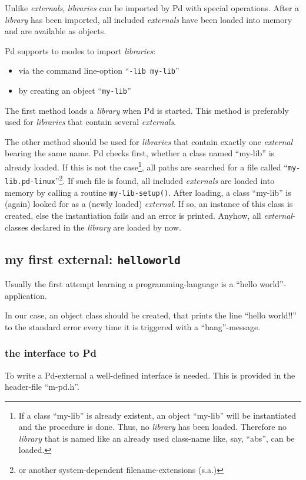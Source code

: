 \documentclass{ppgmus}
\begin{document}
Unlike {\em externals}, {\em libraries} can be imported by Pd with special operations.
After a {\em library} has been imported,
all included {\em externals} have been loaded into memory and are available as objects.

Pd supports to modes to import {\em libraries}:

\begin{itemize}
\item via the command line-option ``{\tt -lib my-lib}''
\item by creating an object ``{\tt my-lib}''
\end{itemize}

The first method loads a {\em library} when Pd is started.
This method is preferably used for {\em libraries} that contain several {\em externals}.

The other method should be used for {\em libraries} that contain exactly
one {\em external} bearing the same name.
Pd checks first, whether a class named ``my-lib'' is already loaded.
If this is not the case\footnote{
If a class ``my-lib'' is already existent, an object ``my-lib'' will be instantiated
and the procedure is done. 
Thus, no {\em library} has been loaded.
Therefore no {\em library} that is named like an already used class-name like, say, ``abs'',
can be loaded.}, all paths are searched for a file called
``{\tt my-lib.pd-linux}''\footnote{or another system-dependent filename-extensions (s.a.)}.
If such file is found, all included {\em externals} are loaded into memory by calling a
routine \verb+my-lib-setup()+.
After loading, a class ``my-lib'' is (again) looked for as a (newly loaded) {\em external}.
If so, an instance of this class is created, else the instantiation fails and an error is
printed.
Anyhow, all {\em external}-classes declared in the {\em library} are loaded by now.


\subsection{my first external: {\tt helloworld}}
Usually the first attempt learning a programming-language is a ``hello world''-application.

In our case, an object class should be created, that prints the line ``hello world!!'' to
the standard error every time it is triggered with a ``bang''-message.



\subsubsection{the interface to Pd}
To write a Pd-external a well-defined interface is needed.
This is provided in the header-file ``m-pd.h''.
\end{document}

